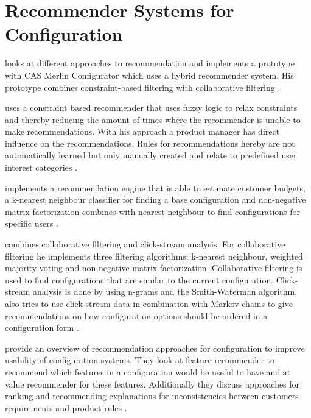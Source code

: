 \section{Recommender Systems for Configuration}
\label{sec:Related_Work:RecommenderSystemsForConfiguration}
\begin{description}[style=unboxed, leftmargin=0cm, font=\normalfont]
    \item[\citeauthor{rubinshteynEntwicklungHybridenRecommender2018}] looks at different approaches to recommendation and implements a prototype with CAS Merlin Configurator which uses a hybrid recommender system. His prototype combines constraint-based filtering with collaborative filtering \cite{rubinshteynEntwicklungHybridenRecommender2018}.

    \item [\citeauthor{benzMoeglichkeitenIntelligenterEmpfehlungssysteme2017}] uses a constraint based recommender that uses fuzzy logic to relax constraints and thereby reducing the amount of times where the recommender is unable to make recommendations. With his approach a product manager has direct influence on the recommendations. Rules for recommendations hereby are not automatically learned but only manually created and relate to predefined user interest categories \cite{benzMoeglichkeitenIntelligenterEmpfehlungssysteme2017}.

    \item [\citeauthor{ullmannEntwurfUndUmsetzung2017}] implements a recommendation engine that is able to estimate customer budgets, a k-nearest neighbour classifier for finding a base configuration and non-negative matrix factorization combines with nearest neighbour to find configurations for specific users \cite{ullmannEntwurfUndUmsetzung2017}. \par

    \item[\citeauthor{wetzelPersonalisierterUndLernender2017}] combines collaborative filtering and click-stream analysis. For collaborative filtering he implements three filtering algorithms: k-nearest neighbour, weighted majority voting and non-negative matrix factorization. Collaborative filtering is used to find configurations that are similar to the current configuration. Click-stream analysis is done by using n-grams and the Smith-Waterman algorithm. \citeauthor{wetzelPersonalisierterUndLernender2017} also tries to use click-stream data in combination with Markov chains to give recommendations on how configuration options should be ordered in a configuration form \cite{wetzelPersonalisierterUndLernender2017}.

    \item[\citeauthor{falknerRecommendationTechnologiesConfigurable2011}] provide an overview of recommendation approaches for configuration to improve usability of configuration systems. They look at feature recommender to recommend which features in a configuration would be useful to have and at value recommender for these features. Additionally they discuss approaches for ranking and recommending explanations for inconsistencies between customers requirements and product rules \cite{falknerRecommendationTechnologiesConfigurable2011}.
\end{description}

